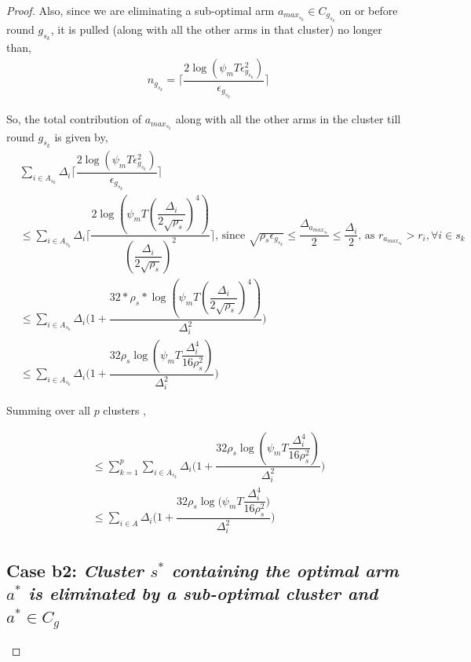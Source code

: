 \begin{proof}
Also, since we are eliminating a sub-optimal arm $a_{max_{s_{k}}}\in C_{g_{s_{k}}}$ on or before round $g_{s_{k}}$, it is pulled (along with all the other arms in that cluster) no longer than,
 \begin{align*}
 &n_{g_{s_{k}}}=\bigg\lceil\dfrac{2\log{(\psi_{m}T\epsilon_{g_{s_{k}}}^{2})}}{\epsilon_{g_{s_{k}}}}\bigg\rceil
 \end{align*}

So, the total contribution of $a_{max_{s_{k}}}$  along with all the other arms in the cluster till round $g_{s_{k}}$ is given by,
 \begin{align*}
 &\sum_{i\in A_{s_{k}}}\Delta_{i}\bigg\lceil\dfrac{2\log{(\psi_{m}T\epsilon_{g_{s_{k}}}^{2})}}{\epsilon_{g_{s_{k}}}}\bigg\rceil\\
 &\leq\sum_{i\in A_{s_{k}}}\Delta_{i}\bigg\lceil\dfrac{2\log{(\psi_{m}T(\dfrac{\Delta_{i}}{2\sqrt{\rho_{s}}})^{4})}}{(\dfrac{\Delta_{i}}{2\sqrt{\rho_{s}}})^{2}}\bigg\rceil \text{, since }\sqrt{\rho_{s}\epsilon_{g_{s_{k}}}}\leq\dfrac{\Delta_{a_{max_{s_{k}}}}}{2}\leq  \dfrac{\Delta_{i}}{2} \text{, as } {r}_{a_{max_{s_{k}}}}>{r}_{i},\forall i\in s_{k}\\
 &\leq\sum_{i\in A_{s_{k}}}\Delta_{i}\bigg(1+\dfrac{32*\rho_{s}*\log{(\psi_{m}T(\dfrac{\Delta_{i}}{2\sqrt{\rho_{s}}})^{4})}}{\Delta_{i}^{2}}\bigg)\\
 &\leq\sum_{i\in A_{s_{k}}}\Delta_{i}\bigg(1+\dfrac{32\rho_{s}\log{(\psi_{m}T\dfrac{\Delta_{i}^{4}}{16\rho_{s}^{2}})}}{\Delta_{i}^{2}}\bigg)
 \end{align*}

 
Summing over all $p$ clusters ,
 
\begin{align*}
&\leq\sum_{k=1}^{p}\sum_{i\in A_{s_{k}}}\Delta_{i}\bigg(1+\dfrac{32\rho_{s}\log{(\psi_{m}T\dfrac{\Delta_{i}^{4}}{16\rho_{s}^{2}})}}{\Delta_{i}^{2}}\bigg)\\
&\leq\sum_{i\in A}\Delta_{i}\bigg(1+\dfrac{32\rho_{s}\log{(\psi_{m}T\dfrac{\Delta_{i}^{4}}{16\rho_{s}^{2}}})}{\Delta_{i}^{2}}\bigg)
\end{align*}


\subsection*{Case b2: \textit{Cluster $s^{*}$ containing the optimal arm $a^{*}$ is eliminated by a sub-optimal cluster and $a^{*}\in C_{g}$ }} 
	

\end{proof}
